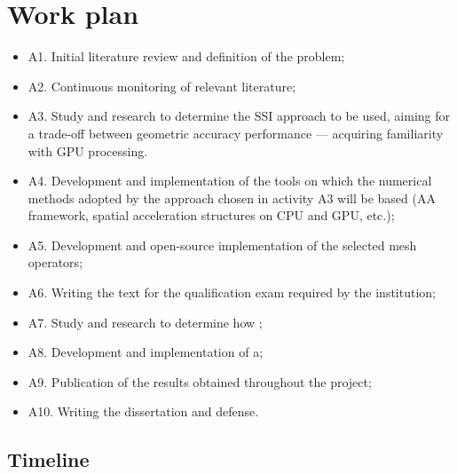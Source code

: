 \chapter{Work plan}

\begin{itemize}
    \item A1. Initial literature review and definition of the problem;
    
    \item A2. Continuous monitoring of relevant literature;
    
    \item A3. Study and research to determine the SSI approach to be used, aiming for a trade-off between geometric accuracy  performance — acquiring familiarity with GPU
    processing.
    
    \item A4. Development and implementation of the tools on which the numerical methods adopted by the approach chosen in activity A3 will be based (AA framework, spatial acceleration structures on CPU and GPU, etc.);
    
    \item A5. Development and open-source implementation of the selected
    mesh operators;
    
    \item A6. Writing the text for the qualification exam required by the institution;
    
    \item A7. Study and research to determine how ;
    
    \item A8. Development and implementation of a;
    
    \item A9. Publication of the results obtained throughout the project;
    
    \item A10. Writing the dissertation and defense.
\end{itemize}

\section{Timeline}

